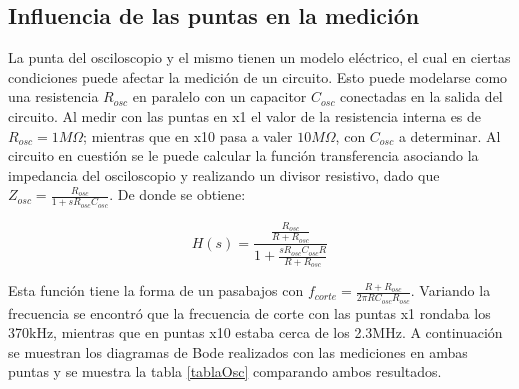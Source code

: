 \subsection{Influencia de las puntas en la medición}

La punta del osciloscopio y el mismo tienen un modelo eléctrico, el cual en ciertas condiciones puede afectar la medición de un circuito. Esto puede modelarse como una resistencia $R_{osc}$ en paralelo con un capacitor $C_{osc}$ conectadas en la salida del circuito.
Al medir con las puntas en x1 el valor de la resistencia interna es de $R_{osc}=1M\Omega$; mientras que en x10 pasa a valer $10M\Omega$, con $C_{osc}$ a determinar.
Al circuito en cuestión se le puede calcular la función transferencia asociando la impedancia del osciloscopio y realizando un divisor resistivo, dado que $Z_{osc}=\frac{R_{osc}}{1+s R_{osc} C_{osc}}$. De donde se obtiene:

\begin{center}
\begin{equation}
\label{transfOsc}
H(s)=\frac{\frac{R_{osc}}{R+R_{osc}}}{1+\frac{s R_{osc} C_{osc} R}{R+R_{osc}}}
\end{equation}
\end{center}

Esta función tiene la forma de un pasabajos con $f_{corte}=\frac{R+R_{osc}}{2\pi R C_{osc} R_{osc}}$. Variando la frecuencia se encontró que la frecuencia de corte con las puntas x1 rondaba los 370kHz, mientras que en puntas x10 estaba cerca de los 2.3MHz.
A continuación se muestran los diagramas de Bode realizados con las mediciones en ambas puntas y se muestra la tabla \ref{tablaOsc} comparando ambos resultados.


